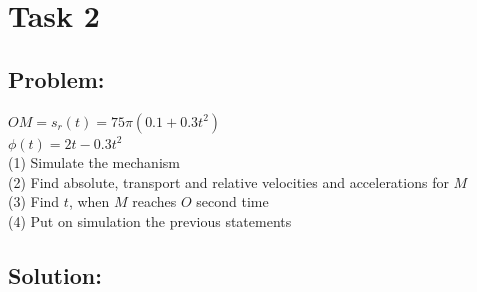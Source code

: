 \documentclass[a4paper,11pt,oneside,article]{memoir}
\begin{document}
\section*{Task 2}
\subsection{Problem:}
$OM = s_r(t) = 75 \pi (0.1 + 0.3t^2)$\\
$\phi (t) = 2t - 0.3t^2$\\
(1) Simulate the mechanism\\
(2) Find absolute, transport and relative velocities and accelerations for $M$\\
(3) Find $t$, when $M$ reaches $O$ second time\\
(4) Put on simulation the previous statements
\subsection{Solution:}
\end{document}

